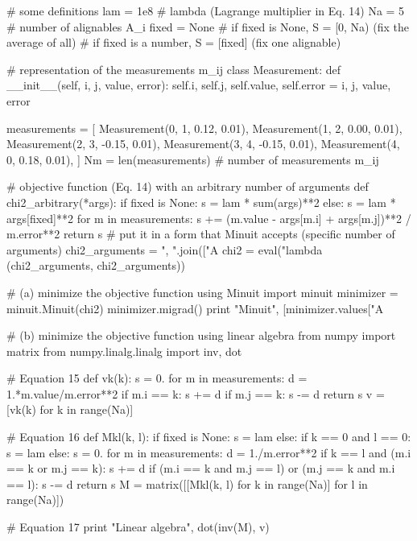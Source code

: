 \documentclass[12pt]{article}
\begin{document}
\begin{python}
# some definitions
lam = 1e8     # lambda (Lagrange multiplier in Eq. 14)
Na = 5        # number of alignables A_i
fixed = None  # if fixed is None, S = [0, Na) (fix the average of all)
              # if fixed is a number, S = [fixed] (fix one alignable)

# representation of the measurements m_ij
class Measurement:
    def __init__(self, i, j, value, error):
        self.i, self.j, self.value, self.error = i, j, value, error

measurements = [
    Measurement(0, 1,  0.12, 0.01),
    Measurement(1, 2,  0.00, 0.01),
    Measurement(2, 3, -0.15, 0.01),
    Measurement(3, 4, -0.15, 0.01),
    Measurement(4, 0,  0.18, 0.01),
    ]
Nm = len(measurements)   # number of measurements m_ij

# objective function (Eq. 14) with an arbitrary number of arguments
def chi2_arbitrary(*args):
    if fixed is None: s = lam * sum(args)**2
    else: s = lam * args[fixed]**2
    for m in measurements:
        s += (m.value - args[m.i] + args[m.j])**2 / m.error**2
    return s
# put it in a form that Minuit accepts (specific number of arguments)
chi2_arguments = ", ".join(["A%
chi2 = eval("lambda %
            (chi2_arguments, chi2_arguments))

# (a) minimize the objective function using Minuit
import minuit
minimizer = minuit.Minuit(chi2)
minimizer.migrad()
print "Minuit", [minimizer.values["A%

# (b) minimize the objective function using linear algebra
from numpy import matrix
from numpy.linalg.linalg import inv, dot

# Equation 15
def vk(k):
    s = 0.
    for m in measurements:
        d = 1.*m.value/m.error**2
        if m.i == k: s += d
        if m.j == k: s -= d
    return s
v = [vk(k) for k in range(Na)]

# Equation 16
def Mkl(k, l):
    if fixed is None: s = lam
    else:
        if k == 0 and l == 0: s = lam
        else: s = 0.
    for m in measurements:
        d = 1./m.error**2
        if k == l and (m.i == k or m.j == k):
            s += d
        if (m.i == k and m.j == l) or (m.j == k and m.i == l):
            s -= d
    return s
M = matrix([[Mkl(k, l) for k in range(Na)] for l in range(Na)])

# Equation 17
print "Linear algebra", dot(inv(M), v)
\end{python}
\end{document}
